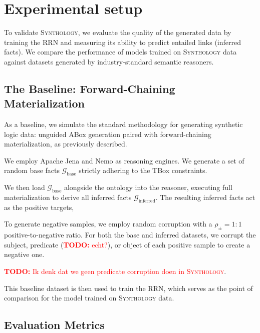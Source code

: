 \documentclass{IOS-Book-Article}     %
\newcommand{\todo}[1]{\textcolor{red}{\textbf{TODO:} #1}}
\begin{document}
\section{Experimental setup}
\label{ch:experiments}

To validate \textsc{Synthology}, we evaluate the quality of the generated data by training the RRN \cite{hohenecker2020ontology} and measuring its ability to predict entailed links (inferred facts). We compare the performance of models trained on \textsc{Synthology} data against datasets generated by industry-standard semantic reasoners.

\subsection{The Baseline: Forward-Chaining Materialization}

As a baseline, we simulate the standard methodology for generating synthetic logic data: unguided ABox generation paired with forward-chaining materialization, as previously described.

We employ Apache Jena and Nemo as reasoning engines. We generate a set of random base facts $\mathcal{G}_\text{base}$ strictly adhering to the TBox constraints.


We then load $\mathcal{G}_\text{base}$ alongside the ontology into the reasoner, executing full materialization to derive all inferred facts $\mathcal{G}_\text{inferred}$. The resulting inferred facts act as the positive targets,

To generate negative samples, we employ random corruption with a $\rho_{\pm} = 1:1$ positive-to-negative ratio. For both the base and inferred datasets, we corrupt the subject, predicate (\todo{echt?}), or object of each positive sample to create a negative one.

\todo{Ik denk dat we geen predicate corruption doen in \textsc{Synthology}}.

This baseline dataset is then used to train the RRN, which serves as the point of comparison for the model trained on \textsc{Synthology} data.

\subsection{Evaluation Metrics}
\end{document}
